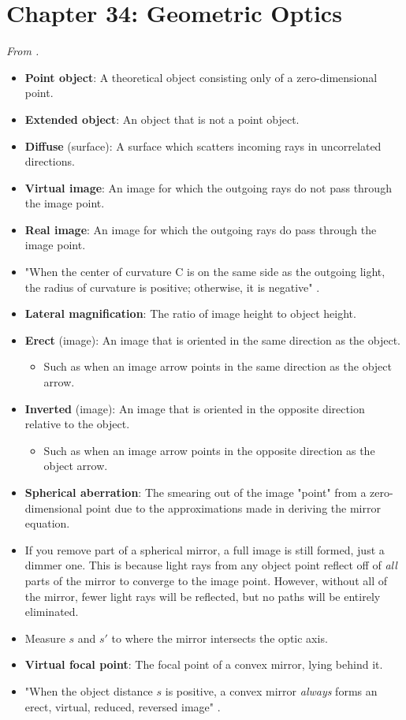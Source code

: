 \documentclass[../notes.tex]{subfiles}
\begin{document}
\section{Chapter 34: Geometric Optics}
\emph{From \textcite{bib:YoungFreedman}.}
\begin{itemize}
    \item {}\textbf{Point object}: A theoretical object consisting only of a zero-dimensional point.
    \item \textbf{Extended object}: An object that is not a point object.
    \item \textbf{Diffuse} (surface): A surface which scatters incoming rays in uncorrelated directions.
    \item \textbf{Virtual image}: An image for which the outgoing rays do not pass through the image point.
    \item \textbf{Real image}: An image for which the outgoing rays do pass through the image point.
    \item "When the center of curvature C is on the same side as the outgoing light, the radius of curvature is positive; otherwise, it is negative" \parencite[1112]{bib:YoungFreedman}.
    \item \textbf{Lateral magnification}: The ratio of image height to object height.
    \item \textbf{Erect} (image): An image that is oriented in the same direction as the object.
    \begin{itemize}
        \item Such as when an image arrow points in the same direction as the object arrow.
    \end{itemize}
    \item \textbf{Inverted} (image): An image that is oriented in the opposite direction relative to the object.
    \begin{itemize}
        \item Such as when an image arrow points in the opposite direction as the object arrow.
    \end{itemize}
    \item \textbf{Spherical aberration}: The smearing out of the image "point" from a zero-dimensional point due to the approximations made in deriving the mirror equation.
    \item If you remove part of a spherical mirror, a full image is still formed, just a dimmer one. This is because light rays from any object point reflect off of \emph{all} parts of the mirror to converge to the image point. However, without all of the mirror, fewer light rays will be reflected, but no paths will be entirely eliminated.
    \item Measure $s$ and $s'$ to where the mirror intersects the optic axis.
    \item \textbf{Virtual focal point}: The focal point of a convex mirror, lying behind it.
    \item "When the object distance $s$ is positive, a convex mirror \emph{always} forms an erect, virtual, reduced, reversed image" \parencite[1120]{bib:YoungFreedman}.
\end{itemize}
\end{document}
